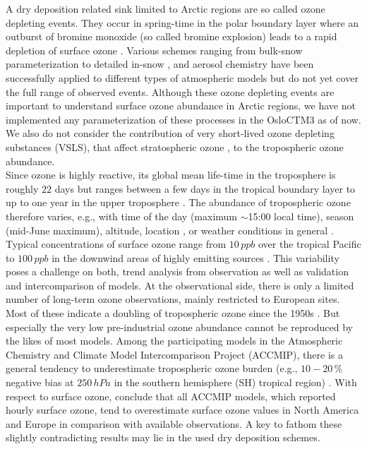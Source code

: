 \documentclass[gmd, manuscript]{copernicus}
\begin{document}
A dry deposition related sink limited to Arctic regions are so called ozone depleting events. They occur in spring-time in the polar boundary layer where an outburst of bromine monoxide  (so called bromine explosion) leads to a rapid depletion of surface ozone \citep{JGR:Oltmans1981,GRL:Bottenheim1986,Nat:Barrie1988,JGR:Bottenheim2006}. Various schemes ranging from bulk-snow parameterization \citep{ACP:Toyota2011,GMD:Falk2018} to detailed in-snow \citep{ACP:Toyota2014a}, and aerosol chemistry \citep{ACP:Yang2010} have been successfully applied to different types of atmospheric models but do not yet cover the full range of observed events. Although these ozone depleting events are important to understand surface ozone abundance in Arctic regions, we have not implemented any parameterization of these processes in the OsloCTM3 as of now. We also do not consider the contribution of very short-lived ozone depleting substances (VSLS), that affect stratospheric ozone \citep{JGR:Warwick2006, ACP:Ziska2013, ACP:Hossaini2016, ACP:Falk2017}, to the tropospheric ozone abundance.\\
Since ozone is highly reactive, its global mean life-time in the troposphere is roughly $22$ days but ranges between a few days in the tropical boundary layer to up to one year in the upper troposphere \citep{JGR:Stevenson2005,ACP:Young2013}. The abundance of tropospheric ozone therefore varies, e.g., with time of the day (maximum $\sim$15:00 local time), season (mid-June maximum), altitude, location \citep{ACP:Schnell2015}, or weather conditions in general \citep{ACP:Otero2018}. Typical concentrations of surface ozone range from $10\,\unit{ppb}$ over the tropical Pacific to $100\,\unit{ppb}$ in the downwind areas of highly emitting sources \citep[Chapter 8]{IPCC2013}. This variability poses a challenge on both, trend analysis from observation as well as validation and intercomparison of models. At the observational side, there is only a limited number of long-term ozone observations, mainly restricted to European sites. Most of these indicate a doubling of tropospheric ozone since the 1950s \citep[Chapter 2]{IPCC2013}. But especially the very low pre-industrial ozone abundance cannot be reproduced by the likes of most models. Among the participating models in the Atmospheric Chemistry and Climate Model Intercomparison Project (ACCMIP), there is a general tendency to underestimate tropospheric ozone burden (e.g., $10-20\,\unit{\%}$ negative bias at $250\,\unit{hPa}$ in the southern hemisphere (SH) tropical region) \citep[Chapter 8]{IPCC2013}. With respect to surface ozone, \citet{ACP:Schnell2015} conclude that all ACCMIP models, which reported hourly surface ozone, tend to overestimate surface ozone values in North America and Europe in comparison with available observations. A key to fathom these slightly contradicting results may lie in the used dry deposition schemes.\\
\end{document}
